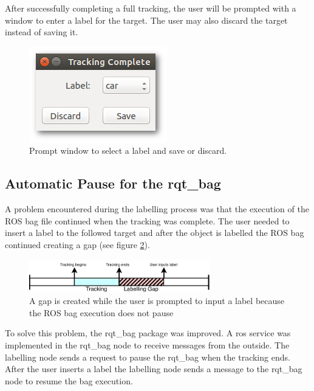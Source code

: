 After successfully completing a full tracking, the user will be prompted with a window to enter a label for the target. The user may also discard the target instead of saving it.


\begin{figure}[htp]
	\centering
	\includegraphics[width=.4\textwidth]{caplabel/imgs/labellinggui2.png}
	\caption{Prompt window to select a label and save or discard.}
	\label{fig:labellinggui2}
\end{figure}

\subsection{Automatic Pause for the rqt\_bag}

A problem encountered during the labelling process was that the execution of the ROS bag file continued when the tracking was complete. The user needed to insert a label to the followed target and after the object is labelled the ROS bag continued creating a gap (see figure \ref{fig:problem}). 

\begin{figure}[htp]
	
	\centering
	\includegraphics[width=0.7\textwidth]{caplabel/imgs/diagramtracking.pdf}
	
	\caption{A gap is created while the user is prompted to input a label because the ROS bag execution does not pause}
	\label{fig:problem}
	
\end{figure}

To solve this problem, the rqt\_bag package was improved. A \gls{ros} service was implemented in the rqt\_bag node to receive messages from the outside. The labelling node sends a request to pause the rqt\_bag when the tracking ends. After the user inserts a label the labelling node sends a message to the rqt\_bag node to resume the bag execution.


